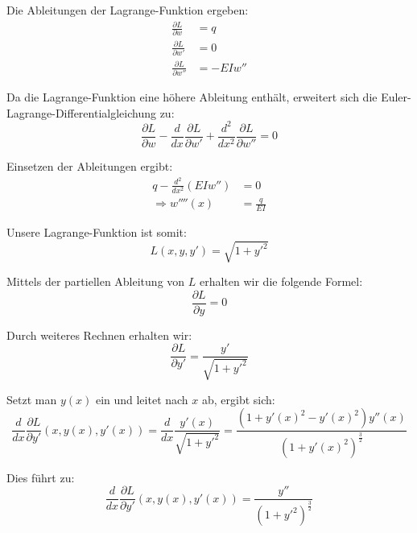 Die Ableitungen der Lagrange-Funktion ergeben:
\begin{equation}
	\begin{align}
		\frac{\partial L}{\partial w} &= q \\
		\frac{\partial L}{\partial w'} &= 0 \\
		\frac{\partial L}{\partial w''} &= -E I w''
	\end{align}
\end{equation}

Da die Lagrange-Funktion eine höhere Ableitung enthält, erweitert sich die Euler-Lagrange-Differentialgleichung zu:
\begin{equation}
	\frac{\partial L}{\partial w} - \frac{d}{dx} \frac{\partial L}{\partial w'} + \frac{d^2}{dx^2} \frac{\partial L}{\partial w''} = 0
\end{equation}

Einsetzen der Ableitungen ergibt:
\begin{equation}
	\begin{align}
		q - \frac{d^2}{dx^2}(E I w'') &= 0 \\
		\Rightarrow w''''(x) &= \frac{q}{E I}
	\end{align}
\end{equation}

Unsere Lagrange-Funktion ist somit:
\begin{equation}
	L(x,y,y') = \sqrt{1 + {y'}^2}
\end{equation}

Mittels der partiellen Ableitung von $L$ erhalten wir die folgende Formel:
\begin{equation}
	\frac{\partial L}{\partial y} = 0
\end{equation}

Durch weiteres Rechnen erhalten wir:
\begin{equation}
	\frac{\partial L}{\partial y'} = \frac{y'}{\sqrt{1 + {y'}^2}}
\end{equation}

Setzt man $y(x)$ ein und leitet nach $x$ ab, ergibt sich:
\begin{equation}
	\frac{d}{dx} \frac{\partial L}{\partial y'}(x,y(x),y'(x)) = \frac{d}{dx} \frac{y'(x)}{\sqrt{1 + {y'}^2}} = \frac{(1 + {y'(x)}^2 - {y'(x)}^2) y''(x)}{(1 + {y'(x)}^2)^{\frac{3}{2}}}
\end{equation}

Dies führt zu:
\begin{equation}
	\frac{d}{dx} \frac{\partial L}{\partial y'}(x,y(x),y'(x)) = \frac{y''}{(1 + {y'}^2)^{\frac{3}{2}}}
\end{equation}

